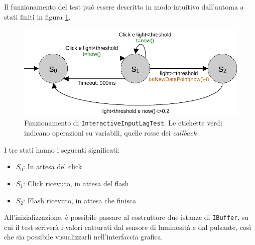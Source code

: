 Il funzionamento del test può essere descritto in modo intuitivo dall'automa a stati finiti in figura \ref{fig:interactiveInputLagTest_fsm}.

\begin{figure}[H]
	\centering
	\includegraphics[width=.8\textwidth]{Applicazione_files/interactiveInputLagTest_fsm.pdf}
	\caption{Funzionamento di \texttt{InteractiveInputLagTest}. Le etichette verdi indicano operazioni su variabili, quelle rosse dei \textit{callback}}
	\label{fig:interactiveInputLagTest_fsm}
\end{figure}

I tre stati hanno i seguenti significati:\begin{itemize}
	\item \textbf{$S_0$}: In attesa del click
	\item \textbf{$S_1$}: Click ricevuto, in attesa del flash
	\item \textbf{$S_2$}: Flash ricevuto, in attesa che finisca
\end{itemize}

All'inizializzazione, è possibile passare al costruttore due istanze di \texttt{IBuffer}, su cui il test scriverà i valori catturati dal sensore di luminosità e dal pulsante, così che sia possibile visualizzarli nell'interfaccia grafica.

